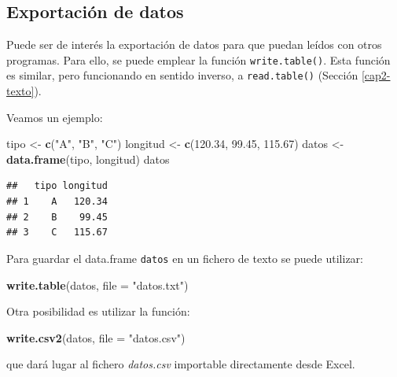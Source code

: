 \documentclass[]{book}
\newenvironment{Shaded}{\begin{snugshade}}{\end{snugshade}}
\newcommand{\KeywordTok}[1]{\textcolor[rgb]{0.13,0.29,0.53}{\textbf{#1}}}
\newcommand{\DataTypeTok}[1]{\textcolor[rgb]{0.13,0.29,0.53}{#1}}
\newcommand{\FloatTok}[1]{\textcolor[rgb]{0.00,0.00,0.81}{#1}}
\newcommand{\StringTok}[1]{\textcolor[rgb]{0.31,0.60,0.02}{#1}}
\newcommand{\NormalTok}[1]{#1}
\begin{document}
\subsection{Exportación de datos}\label{exportaciuxf3n-de-datos}

Puede ser de interés la exportación de datos para que puedan leídos con
otros programas. Para ello, se puede emplear la función
\texttt{write.table()}. Esta función es similar, pero funcionando en
sentido inverso, a \texttt{read.table()} (Sección \ref{cap2-texto}).

Veamos un ejemplo:

\begin{Shaded}
\begin{Highlighting}[]
\NormalTok{tipo <-}\StringTok{ }\KeywordTok{c}\NormalTok{(}\StringTok{"A"}\NormalTok{, }\StringTok{"B"}\NormalTok{, }\StringTok{"C"}\NormalTok{)}
\NormalTok{longitud <-}\StringTok{ }\KeywordTok{c}\NormalTok{(}\FloatTok{120.34}\NormalTok{, }\FloatTok{99.45}\NormalTok{, }\FloatTok{115.67}\NormalTok{)}
\NormalTok{datos <-}\StringTok{ }\KeywordTok{data.frame}\NormalTok{(tipo, longitud)}
\NormalTok{datos}
\end{Highlighting}
\end{Shaded}

\begin{verbatim}
##   tipo longitud
## 1    A   120.34
## 2    B    99.45
## 3    C   115.67
\end{verbatim}

Para guardar el data.frame \texttt{datos} en un fichero de texto se
puede utilizar:

\begin{Shaded}
\begin{Highlighting}[]
\KeywordTok{write.table}\NormalTok{(datos, }\DataTypeTok{file =} \StringTok{"datos.txt"}\NormalTok{)}
\end{Highlighting}
\end{Shaded}

Otra posibilidad es utilizar la función:

\begin{Shaded}
\begin{Highlighting}[]
\KeywordTok{write.csv2}\NormalTok{(datos, }\DataTypeTok{file =} \StringTok{"datos.csv"}\NormalTok{)}
\end{Highlighting}
\end{Shaded}

que dará lugar al fichero \emph{datos.csv} importable directamente desde
Excel.
\end{document}
